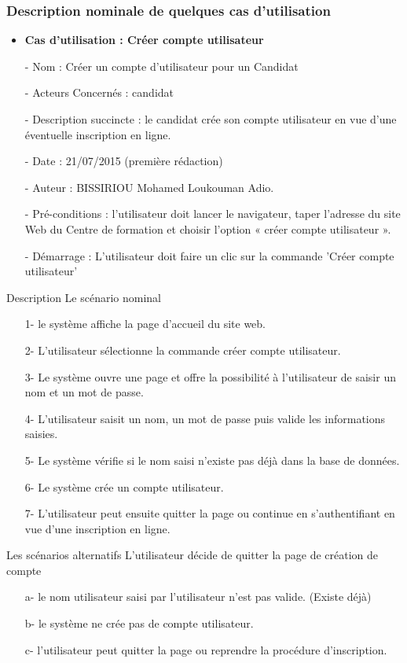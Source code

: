 \subsubsection{Description nominale de quelques cas d'utilisation}
	\begin{itemize}
	\item \textbf{Cas d'utilisation : Créer compte utilisateur}
		\item[-]Nom : Créer un compte d'utilisateur pour un Candidat 
		\item[-]Acteurs Concernés : candidat
		\item[-]Description succincte : le candidat crée son compte 			utilisateur en vue d'une éventuelle inscription en ligne.
		\item[-]Date : 21/07/2015 (première rédaction)
		\item[-]Auteur : BISSIRIOU Mohamed Loukouman Adio.
		\item[-]Pré-conditions : l'utilisateur doit lancer le 					navigateur, taper l'adresse du site Web du Centre de 					formation et choisir l'option « créer compte utilisateur ».
		\item[-]Démarrage : L'utilisateur doit faire un clic sur la 			commande 'Créer compte utilisateur'
	\end{itemize}
	
	\begin{bf}
		Description
		\newline
		Le scénario nominal
	\end{bf}
	\begin{itemize}
	\item[1-]le système affiche la page d'accueil du site web.
	\item[2-]L'utilisateur sélectionne la commande créer compte utilisateur.
	\item[3-]Le système ouvre une page et offre la possibilité à 		l'utilisateur de saisir un nom et un mot de passe.
	\item[4-]L'utilisateur saisit un nom, un mot de passe puis valide les informations saisies. 
	\item[5-]Le système vérifie si le nom saisi n'existe pas déjà dans la base de données.
	\item[6-]Le système crée un compte utilisateur.
	\item[7-]L'utilisateur peut ensuite quitter la page ou continue en s'authentifiant en vue d'une inscription en ligne.
	\end{itemize}
	\begin{bf} 
	Les scénarios alternatifs 
	L'utilisateur décide de quitter la page de création de compte
	\end{bf}
	\begin{itemize}
			\item[a-]le nom utilisateur saisi par l'utilisateur n'est pas valide. (Existe déjà)
	\item[b-]le système ne crée pas de compte utilisateur.
	\item[c-]l'utilisateur peut quitter la page ou reprendre la procédure d'inscription.
	
	\end{itemize}
	
